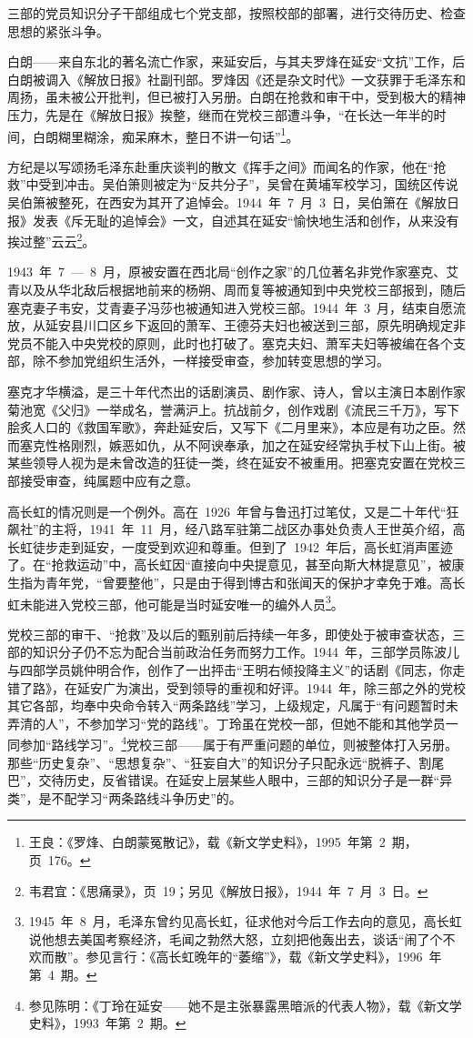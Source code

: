 三部的党员知识分子干部组成七个党支部，按照校部的部署，进行交待历史、检查思想的紧张斗争。

白朗——来自东北的著名流亡作家，来延安后，与其夫罗烽在延安“文抗”工作，后白朗被调入《解放日报》社副刊部。罗烽因《还是杂文时代》一文获罪于毛泽东和周扬，虽未被公开批判，但已被打入另册。白朗在抢救和审干中，受到极大的精神压力，先是在《解放日报》挨整，继而在党校三部遭斗争，“在长达一年半的时间，白朗糊里糊涂，痴呆麻木，整日不讲一句话”\footnote{王良：《罗烽、白朗蒙冤散记》，载《新文学史料》，1995~年第~2~期，页~176。}。

方纪是以写颂扬毛泽东赴重庆谈判的散文《挥手之间》而闻名的作家，他在“抢救”中受到冲击。吴伯箫则被定为“反共分子”，吴曾在黄埔军校学习，国统区传说吴伯箫被整死，在西安为其开了追悼会。1944~年~7~月~3~日，吴伯箫在《解放日报》发表《斥无耻的追悼会》一文，自述其在延安“愉快地生活和创作，从来没有挨过整”云云\footnote{韦君宜：《思痛录》，页~19；另见《解放日报》，1944~年~7~月~3~日。}。

1943~年~7~—~8~月，原被安置在西北局“创作之家”的几位著名非党作家塞克、艾青以及从华北敌后根据地前来的杨朔、周而复等被通知到中央党校三部报到，随后塞克妻子韦安，艾青妻子冯莎也被通知进入党校三部。1944~年~3~月，结束自愿流放，从延安县川口区乡下返回的萧军、王德芬夫妇也被送到三部，原先明确规定非党员不能入中央党校的原则，此时也打破了。塞克夫妇、萧军夫妇等被编在各个支部，除不参加党组织生活外，一样接受审查，参加转变思想的学习。

塞克才华横溢，是三十年代杰出的话剧演员、剧作家、诗人，曾以主演日本剧作家菊池宽《父归》一举成名，誉满沪上。抗战前夕，创作戏剧《流民三千万》，写下脍炙人口的《救国军歌》，奔赴延安后，又写下《二月里来》，本应是有功之臣。然而塞克性格刚烈，嫉恶如仇，从不阿谀奉承，加之在延安经常执手杖下山上街。被某些领导人视为是未曾改造的狂徒一类，终在延安不被重用。把塞克安置在党校三部接受审查，纯属题中应有之意。

高长虹的情况则是一个例外。高在~1926~年曾与鲁迅打过笔仗，又是二十年代“狂飙社”的主将，1941~年~11~月，经八路军驻第二战区办事处负责人王世英介绍，高长虹徒步走到延安，一度受到欢迎和尊重。但到了~1942~年后，高长虹消声匿迹了。在“抢救运动”中，高长虹因“直接向中央提意见，甚至向斯大林提意见”，被康生指为青年党，“曾要整他”，只是由于得到博古和张闻天的保护才幸免于难。高长虹未能进入党校三部，他可能是当时延安唯一的编外人员\footnote{1945~年~8~月，毛泽东曾约见高长虹，征求他对今后工作去向的意见，高长虹说他想去美国考察经济，毛闻之勃然大怒，立刻把他轰出去，谈话“闹了个不欢而散”。参见言行：《高长虹晚年的“萎缩”》，载《新文学史料》，1996~年第~4~期。}。

党校三部的审干、“抢救”及以后的甄别前后持续一年多，即使处于被审查状态，三部的知识分子仍不忘为配合当前政治任务而努力工作。1944~年，三部学员陈波儿与四部学员姚仲明合作，创作了一出抨击“王明右倾投降主义”的话剧《同志，你走错了路》，在延安广为演出，受到领导的重视和好评。1944~年，除三部之外的党校其它各部，均奉中央命令转入“两条路线”学习，上级规定，凡属于“有问题暂时未弄清的人”，不参加学习“党的路线”。丁玲虽在党校一部，但她不能和其他学员一同参加“路线学习”。\footnote{参见陈明：《丁玲在延安——她不是主张暴露黑暗派的代表人物》，载《新文学史料》，1993~年第~2~期。}党校三部——属于有严重问题的单位，则被整体打入另册。那些“历史复杂”、“思想复杂”、“狂妄自大”的知识分子只配永远“脱裤子、割尾巴”，交待历史，反省错误。在延安上层某些人眼中，三部的知识分子是一群“异类”，是不配学习“两条路线斗争历史”的。


